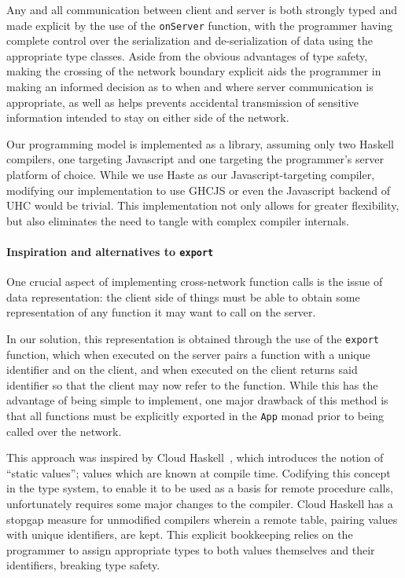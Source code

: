 \documentclass[preprint]{sigplanconf}
\begin{document}
Any and all communication between client and server is both strongly typed
and made explicit by the use of the \lstinline!onServer! function, with the
programmer having complete control over the serialization and de-serialization
of data using the appropriate type classes. Aside from the obvious advantages
of type safety, making the crossing of the network boundary explicit aids the
programmer in making an informed decision as to when and where server
communication is appropriate, as well as helps prevents accidental transmission
of sensitive information intended to stay on either side of the network.

Our programming model is implemented as a library, assuming only two Haskell
compilers, one targeting Javascript and one targeting the programmer's server
platform of choice. While we use Haste as our Javascript-targeting compiler,
modifying our implementation to use GHCJS or even the Javascript backend of UHC
would be trivial. This implementation not only allows for greater flexibility,
but also eliminates the need to tangle with complex compiler internals.

\paragraph{Inspiration and alternatives to \lstinline!export!} One crucial
aspect of implementing cross-network function calls is the issue of data
representation: the client side of things must be able to obtain some
representation of any function it may want to call on the server.

In our solution, this representation is obtained through the use of the \lstinline!export! function, which when executed on the server pairs a function with a
unique identifier and on the client, and when executed on the client returns
said identifier so that the client may now refer to the function. While this
has the advantage of being simple to implement, one major drawback of this
method is that all functions must be explicitly exported in the \lstinline!App!
monad prior to being called over the network.

This approach was inspired by Cloud Haskell\ \cite{cloudhaskell}, which
introduces the notion of ``static values''; values which are known at compile
time. Codifying this concept in the type system, to enable it to be used as a
basis for remote procedure calls, unfortunately requires some major changes to
the compiler. Cloud Haskell has a stopgap measure for unmodified compilers
wherein a remote table, pairing values with unique identifiers, are kept.
This explicit bookkeeping relies on the programmer to assign appropriate types
to both values themselves and their identifiers, breaking type safety.
\end{document}
